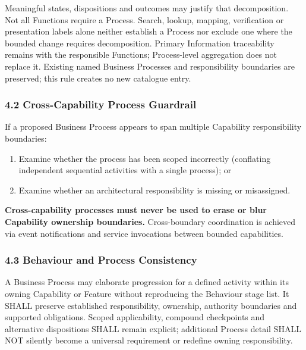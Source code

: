 Meaningful states, dispositions and outcomes may justify that decomposition. Not all Functions require a Process. Search, lookup, mapping, verification or presentation labels alone neither establish a Process nor exclude one where the bounded change requires decomposition. Primary Information traceability remains with the responsible Functions; Process-level aggregation does not replace it. Existing named Business Processes and responsibility boundaries are preserved; this rule creates no new catalogue entry.

\label{rad:metamodel:221}
\subsubsection*{4.2 Cross-Capability Process Guardrail}
\label{rad:metamodel:222}

If a proposed Business Process appears to span multiple Capability responsibility boundaries:

\label{rad:metamodel:223}

\begin{enumerate}

\item 
Examine whether the process has been scoped incorrectly (conflating independent sequential activities with a single process); or



\item 
Examine whether an architectural responsibility is missing or misassigned.



\end{enumerate}
\label{rad:metamodel:226}

\textbf{Cross-capability processes must never be used to erase or blur Capability ownership boundaries.} Cross-boundary coordination is achieved via event notifications and service invocations between bounded capabilities.

\label{rad:metamodel:228}
\subsubsection*{4.3 Behaviour and Process Consistency}
\label{rad:metamodel:230}

A Business Process may elaborate progression for a defined activity within its owning Capability or Feature without reproducing the Behaviour stage list. It SHALL preserve established responsibility, ownership, authority boundaries and supported obligations. Scoped applicability, compound checkpoints and alternative dispositions SHALL remain explicit; additional Process detail SHALL NOT silently become a universal requirement or redefine owning responsibility.

